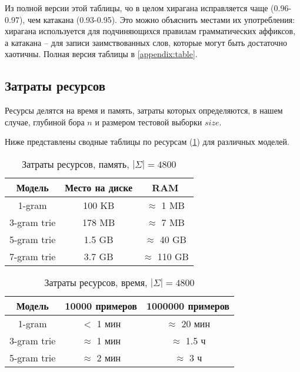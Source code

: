 Из полной версии этой таблицы, чо в целом хирагана исправляется чаще (0.96-0.97), чем катакана (0.93-0.95). Это можно объяснить местами их употребления: хирагана используется для подчиняющихся правилам грамматических аффиксов, а катакана -- для записи заимствованных слов, которые могут быть достаточно хаотичны. Полная версия таблицы в \cref{appendix:table}.

\subsection{ Затраты ресурсов }

Ресурсы делятся на время и память, затраты которых определяются, в нашем случае, глубиной бора $n$ и размером тестовой выборки $size$.

Ниже представлены сводные таблицы по ресурсам (\cref{table:resmem}) для различных моделей.

\begin{table}[H]
	\begin{center}
		\begin{tabular}{|c|c|c|} \hline
			Модель & Место на диске & RAM \\ \hline
			1-gram & 100 KB & $\approx$ 1 MB \\
			3-gram trie &  178 MB & $\approx$ 7 MB \\
			5-gram trie &  1.5 GB & $\approx$ 40 GB \\
			7-gram trie & 3.7 GB & $\approx$ 110 GB \\ \hline
		\end{tabular}
	\caption{Затраты ресурсов, память, $|\Sigma| = 4800$}
	\label{table:resmem}
	\end{center}
\end{table}

\begin{table}[H]
	\begin{center}
		\begin{tabular}{|c|c|c|} \hline
			Модель & 10000 примеров & 1000000 примеров \\ \hline
			1-gram & $<$ 1 мин & $\approx$ 20 мин \\
			3-gram trie &  $\approx$ 1 мин  & $\approx$ 1.5 ч \\
			5-gram trie &  $\approx$ 2 мин & $\approx$ 3 ч \\ \hline
		\end{tabular}
		\caption{Затраты ресурсов, время, $|\Sigma| = 4800$}
		\label{table:restime}
	\end{center}
\end{table}

